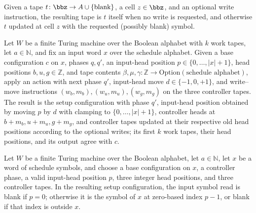 \begin{definition}
\label{Complexity.setupWrite}
\leanok
Given a tape $t \colon \bbz \to A \cup \{\text{blank}\}$, a cell $z \in \bbz$, and an
optional write instruction, the resulting tape is $t$ itself when no write is
requested, and otherwise $t$ updated at cell $z$ with the requested (possibly blank)
symbol.
\end{definition}

\begin{lemma}
\label{Complexity.setupCfg_apply}
\leanok
{}
Let $W$ be a finite Turing machine over the Boolean alphabet with $k$ work tapes, let
$a\in\mathbb{N}$, and fix an input word $x$ over the schedule alphabet. Given a base
configuration $c$ on $x$, phases $q,q'$, an input-head position
$p\in\{0,\ldots,|x|+1\}$, head positions $b,u,g\in\mathbb{Z}$, and tape contents
$\beta,\mu,\gamma\colon\mathbb{Z}\to\mathrm{Option}(\text{schedule alphabet})$, apply an
action with next phase $q'$, input-head move $d\in\{-1,0,+1\}$, and write–move
instructions $(w_b,m_b),(w_u,m_u),(w_g,m_g)$ on the three controller tapes. The result
is the setup configuration with phase $q'$, input-head position obtained by moving $p$
by $d$ with clamping to $\{0,\ldots,|x|+1\}$, controller heads at $b+m_b,u+m_u,g+m_g$,
and controller tapes updated at their respective old head positions according to the
optional writes; its first $k$ work tapes, their head positions, and its output agree
with $c$.
\end{lemma}

\begin{lemma}
\label{Complexity.setupCfg_input}
\leanok
{}
Let $W$ be a finite Turing machine over the Boolean alphabet, let $a\in\mathbb{N}$, let
$x$ be a word of schedule symbols, and choose a base configuration on $x$, a controller
phase, a valid input-head position $p$, three integer head positions, and three
controller tapes. In the resulting setup configuration, the input symbol read is blank
if $p=0$; otherwise it is the symbol of $x$ at zero-based index $p-1$, or blank if that
index is outside $x$.
\end{lemma}

